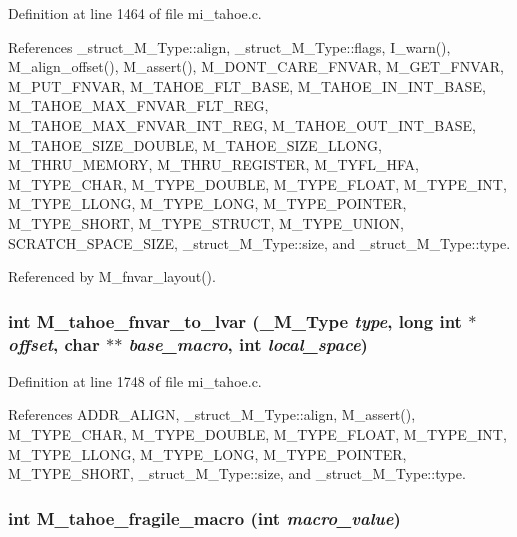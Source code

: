Definition at line 1464 of file mi\_\-tahoe.c.

References \_\-struct\_\-M\_\-Type::align, \_\-struct\_\-M\_\-Type::flags, I\_\-warn(), M\_\-align\_\-offset(), M\_\-assert(), M\_\-DONT\_\-CARE\_\-FNVAR, M\_\-GET\_\-FNVAR, M\_\-PUT\_\-FNVAR, M\_\-TAHOE\_\-FLT\_\-BASE, M\_\-TAHOE\_\-IN\_\-INT\_\-BASE, M\_\-TAHOE\_\-MAX\_\-FNVAR\_\-FLT\_\-REG, M\_\-TAHOE\_\-MAX\_\-FNVAR\_\-INT\_\-REG, M\_\-TAHOE\_\-OUT\_\-INT\_\-BASE, M\_\-TAHOE\_\-SIZE\_\-DOUBLE, M\_\-TAHOE\_\-SIZE\_\-LLONG, M\_\-THRU\_\-MEMORY, M\_\-THRU\_\-REGISTER, M\_\-TYFL\_\-HFA, M\_\-TYPE\_\-CHAR, M\_\-TYPE\_\-DOUBLE, M\_\-TYPE\_\-FLOAT, M\_\-TYPE\_\-INT, M\_\-TYPE\_\-LLONG, M\_\-TYPE\_\-LONG, M\_\-TYPE\_\-POINTER, M\_\-TYPE\_\-SHORT, M\_\-TYPE\_\-STRUCT, M\_\-TYPE\_\-UNION, SCRATCH\_\-SPACE\_\-SIZE, \_\-struct\_\-M\_\-Type::size, and \_\-struct\_\-M\_\-Type::type.

Referenced by M\_\-fnvar\_\-layout().
\subsubsection{\setlength{\rightskip}{0pt plus 5cm}int M\_\-tahoe\_\-fnvar\_\-to\_\-lvar (\bf{\_\-M\_\-Type} {\em type}, long int $\ast$ {\em offset}, char $\ast$$\ast$ {\em base\_\-macro}, int {\em local\_\-space})}\label{m__tahoe_8h_674bc7806a976981d30794d202023162}




Definition at line 1748 of file mi\_\-tahoe.c.

References ADDR\_\-ALIGN, \_\-struct\_\-M\_\-Type::align, M\_\-assert(), M\_\-TYPE\_\-CHAR, M\_\-TYPE\_\-DOUBLE, M\_\-TYPE\_\-FLOAT, M\_\-TYPE\_\-INT, M\_\-TYPE\_\-LLONG, M\_\-TYPE\_\-LONG, M\_\-TYPE\_\-POINTER, M\_\-TYPE\_\-SHORT, \_\-struct\_\-M\_\-Type::size, and \_\-struct\_\-M\_\-Type::type.
\subsubsection{\setlength{\rightskip}{0pt plus 5cm}int M\_\-tahoe\_\-fragile\_\-macro (int {\em macro\_\-value})}\label{m__tahoe_8h_648bb0854785bf93d3d79a87aa8dd06b}




